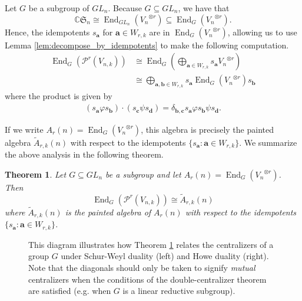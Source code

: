 \documentclass[10pt]{amsart}
\theoremstyle{definition}
\theoremstyle{definition}
\theoremstyle{plain}
\theoremstyle{remark}
\theoremstyle{plain}
\newtheorem{theorem}[theorem]{Theorem}
\theoremstyle{plain}
\newcommand{\C}{\mathbb{C}}
\newcommand{\PP}{\mathcal{P}}
\newcommand{\SG}{\mathfrak{S}}
\newcommand{\bfa}{{\boldsymbol{a}}}
\newcommand{\bfb}{{\boldsymbol{b}}}
\newcommand{\bfc}{{\boldsymbol{c}}}
\newcommand{\bfd}{{\boldsymbol{d}}}
\DeclareMathOperator{\End}{End}
\begin{document}
Let $G$ be a subgroup of $GL_n$. Because $G\subseteq GL_n$, we have that\[\C\SG_n\cong\End_{GL_n}({V_n}^{\otimes r})\subseteq \End_G({V_n}^{\otimes r}).\] Hence, the idempotents $s_\bfa$ for $\bfa\in W_{r,k}$ are in $\End_G({V_n}^{\otimes r})$, allowing us to use Lemma \ref{lem:decompose_by_idempotents} to make the following computation. \begin{align*}
    \End_G\left(\PP^r(V_{n,k})\right)&\cong\End_G\left(\bigoplus_{\bfa\in W_{r,k}}s_\bfa {V_n}^{\otimes r}\right)\\
    &\cong\bigoplus_{\bfa,\bfb\in W_{r,k}}s_\bfa\End_G({V_n}^{\otimes r})s_\bfb
\end{align*} where the product is given by \begin{align}
    (s_\bfa\varphi s_\bfb)\cdot(s_\bfc\psi s_\bfd)=\delta_{\bfb,\bfc}s_\bfa\varphi s_\bfb \psi s_\bfd.
\end{align}

If we write $A_r(n)=\End_G({V_n}^{\otimes r})$, this algebra is precisely the painted algebra $\tilde{A}_{r,k}(n)$ with respect to the idempotents $\{s_\bfa:\bfa\in W_{r,k}\}$. We summarize the above analysis in the following theorem.

\begin{theorem}\label{thm:isomorphic_to_painted} Let $G\subseteq GL_n$ be a subgroup and let $A_r(n)=\End_G\left({V_n}^{\otimes r}\right)$. Then\[\End_G\left(\PP^r(V_{n,k})\right)\cong \tilde{A}_{r,k}(n)\] where $\tilde{A}_{r,k}(n)$ is the painted algebra of $A_r(n)$ with respect to the idempotents $\{s_\bfa:\bfa\in W_{r,k}\}$.
\end{theorem}

\begin{figure}[ht]
    \centering
    \caption{This diagram illustrates how Theorem \ref{thm:isomorphic_to_painted} relates the centralizers of a group $G$ under Schur-Weyl duality (left) and Howe duality (right). Note that the diagonals should only be taken to signify \textit{mutual} centralizers when the conditions of the double-centralizer theorem are satisfied (e.g. when $G$ is a linear reductive subgroup).}
    \label{fig:seesaw}
\end{figure}
\end{document}
